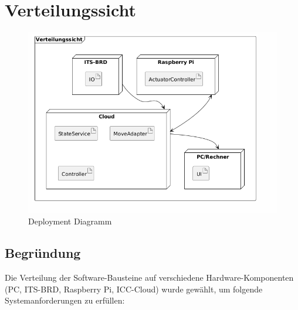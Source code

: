 \chapter{Verteilungssicht}
\begin{figure}[h!]
	\centering
	\includegraphics[scale=.5]{diagrams/deploymentView.png}
	\caption{Deployment Diagramm}
	\label{fig:deployment-prod-grafik}
\end{figure}

\section{Begründung}

Die Verteilung der Software-Bausteine auf verschiedene Hardware-Komponenten (PC, ITS-BRD, Raspberry Pi, ICC-Cloud) wurde gewählt, um folgende Systemanforderungen zu erfüllen:


